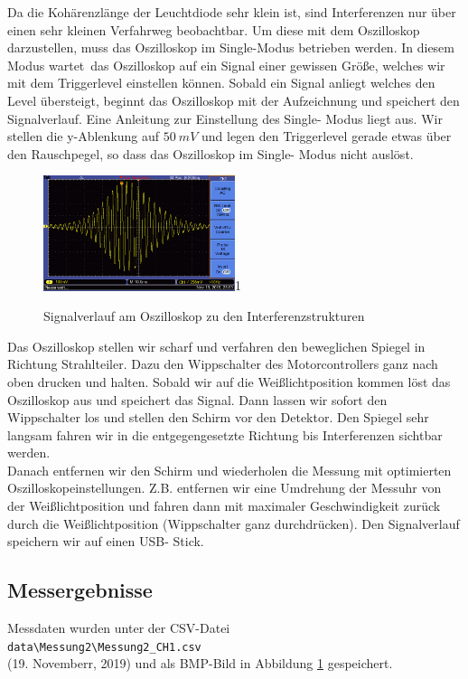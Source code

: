 \documentclass[a4paper,10pt]{article}
\begin{document}
Da die Kohärenzlänge der Leuchtdiode sehr klein ist, sind Interferenzen nur über einen sehr kleinen Verfahrweg beobachtbar. Um diese mit dem Oszilloskop darzustellen, muss das Oszilloskop im Single-Modus betrieben werden. In diesem Modus \glqq wartet\grqq~das Oszilloskop auf ein Signal einer gewissen Größe, welches wir mit dem Triggerlevel einstellen können. Sobald ein Signal anliegt welches den Level übersteigt, beginnt das Oszilloskop mit der Aufzeichnung und speichert den Signalverlauf. Eine Anleitung zur Einstellung des Single- Modus liegt aus. Wir stellen die y-Ablenkung auf \(50\:mV\) und legen den Triggerlevel gerade etwas über den Rauschpegel, so dass das Oszilloskop im Single- Modus nicht auslöst.\\ \begin{figure}
  \centering
  \begin{annotate}{\includegraphics[width=0.5\textwidth]{pic2.png}}{1}
  \end{annotate}
    \caption{Signalverlauf am Oszilloskop zu den  Interferenzstrukturen}
 \label{fig:pic2}
\end{figure} 
Das Oszilloskop stellen wir scharf und verfahren den beweglichen Spiegel in Richtung Strahlteiler. Dazu den Wippschalter des Motorcontrollers ganz nach oben drucken und halten. Sobald wir auf die Weißlichtposition kommen löst das Oszilloskop aus und speichert das Signal. Dann lassen wir sofort den Wippschalter los und stellen den Schirm vor den Detektor. Den Spiegel sehr langsam fahren wir in die entgegengesetzte Richtung bis Interferenzen sichtbar werden.\\

Danach entfernen wir den Schirm und wiederholen die Messung mit optimierten Oszilloskopeinstellungen. Z.B. entfernen wir eine Umdrehung der Messuhr von der Weißlichtposition und fahren dann mit maximaler Geschwindigkeit zurück durch die Weißlichtposition (Wippschalter ganz durchdrücken). Den Signalverlauf speichern wir auf einen USB- Stick.

\subsection{Messergebnisse}
Messdaten wurden unter der CSV-Datei\\\texttt{data\textbackslash Messung2\textbackslash Messung2\_CH1.csv}\\  (19. Novemberr, 2019) und als BMP-Bild in Abbildung \ref{fig:pic2} gespeichert.\\
\end{document}
